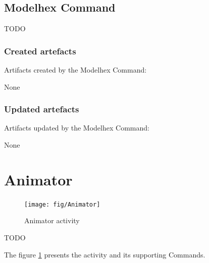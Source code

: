 \documentclass{gemoc} %
\begin{document}
\subsection{Modelhex Command}
TODO
\subsubsection{Created artefacts}
Artifacts created by the Modelhex Command:

	None
\subsubsection{Updated artefacts}
Artifacts updated by the Modelhex Command:

	None

\section{Animator}
\label{sec:Animator}
\begin{figure}[h!]
		\center
		\texttt{[image: fig/Animator]}
		\caption{Animator activity}
		\label{fig:Animator}
\end{figure}

TODO

The figure \ref{fig:Animator} presents the activity and its supporting Commands.


\end{document}
